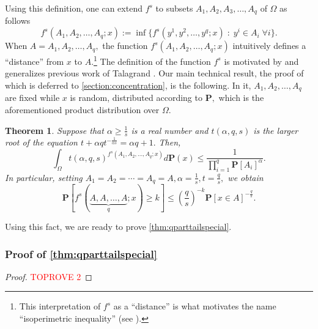 \documentclass[11pt]{article}\usepackage{amsfonts}
\newtheorem{theorem}{Theorem}
\numberwithin{theorem}{subsection}
\newcommand{\prob}{\mathbf{P}}
\begin{document}
\noindent
Using this definition, one can extend $f^s$ to subsets $A_1, A_2, A_3, \ldots, A_q$ of $\Omega$ as follows
$$
       f^s(A_1, A_2, \ldots, A_q; x) := 
       \inf\{f^s(y^1, y^2, \ldots, y^q; x) \; : \; y^i\in A_i\; \forall i\}.
$$
When $A = A_1, A_2, \ldots, A_q,$ the function $f^s(A_1, A_2, \ldots, A_q; x)$ intuitively defines a ``distance'' from $x$ to $A.$\footnote{This interpretation of $f^s$ as a ``distance'' is what motivates the name ``isoperimetric inequality'' (see \cite{Talagrand01}).} The definition of the function $f^s$ is motivated by and generalizes previous work of Talagrand \cite{Talagrand01,Talagrand96}. Our main technical result, the proof of which is deferred to 
\cref{section:concentration}, is the following. In it, $A_1, A_2, \ldots, A_q$ are fixed while $x$ is random, distributed according to $\prob,$ which is the aforementioned product distribution over $\Omega.$

\begin{theorem}
\label{thm:talagrandgenerals}
\label{thm:specialcaseqpartitioning}
Suppose that $\alpha\ge \frac{1}{s}$ is a real number and $t(\alpha, q,s)$ is the larger root of the equation $t + \alpha q t^{-\frac{1}{\alpha s}} = \alpha q + 1.$ Then, 
$$
\int_{\Omega}
t(\alpha, q, s)^{f^s(A_1, A_2, \ldots, A_q; x)}d\prob(x)\le 
\frac{1}{\prod_{i=1}^q \prob[A_i]^{\alpha}}.
$$
In particular, setting $A_1 = A_2 = \cdots = A_q = A, \alpha = \frac{1}{s}, t = \frac{q}{s},$ we obtain
$$\prob[f^s(\underbrace{A, A, \ldots, A}_{q}; x)\ge k]\le 
\left(\frac{q}{s}\right)^{-k}\prob[x \in A]^{-\frac{q}{s}}.$$
\end{theorem}

\noindent
Using this fact, we are ready to prove \cref{thm:qparttailspecial}.

\subsubsection{Proof of \cref{thm:qparttailspecial}}
\begin{proof}\textcolor{red}{TOPROVE 2}\end{proof}
\end{document}
